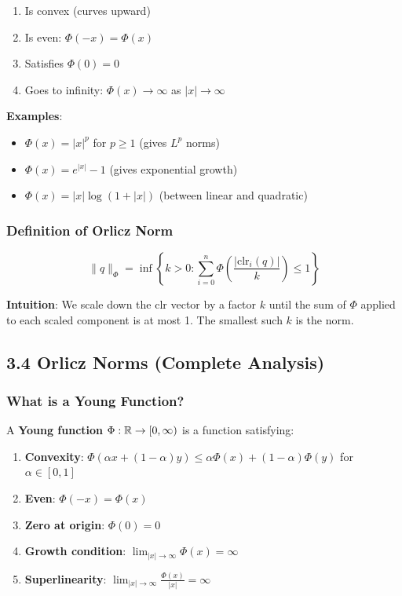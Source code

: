 \documentclass{amsart}
\let\originalmathbb\mathbb
\renewcommand{\mathbb}[1]{%
    \ifstrequal{#1}{1}{\mathbbm{#1}}{\originalmathbb{#1}}%
}
\theoremstyle{plain}
\theoremstyle{definition}
\theoremstyle{remark}
\begin{document}
\begin{enumerate}
	\item Is convex (curves upward)
	\item Is even: $\Phi(-x) = \Phi(x)$
	\item Satisfies $\Phi(0) = 0$
	\item Goes to infinity: $\Phi(x) \to \infty$ as $|x| \to \infty$
\end{enumerate}

\textbf{Examples}:

\begin{itemize}
	\item $\Phi(x) = |x|^p$ for $p \geq 1$ (gives $L^p$ norms)
	\item $\Phi(x) = e^{|x|} - 1$ (gives exponential growth)
	\item $\Phi(x) = |x| \log(1 + |x|)$ (between linear and quadratic)
\end{itemize}

\subsubsection{Definition of Orlicz Norm}
\[
\|q\|_\Phi = \inf \left\{ k > 0 : \sum_{i=0}^n \Phi\left(\frac{|\text{clr}_i(q)|}{k}\right) \leq 1 \right\}
\]

\textbf{Intuition}: We scale down the clr vector by a factor $k$ until the sum of $\Phi$ applied to each scaled component is at most 1. The smallest such $k$ is the norm.

\subsection{3.4 Orlicz Norms (Complete Analysis)}

\subsubsection{What is a Young Function?}

A \textbf{Young function} $\Phi: \mathbb{R} \to [0, \infty)$ is a function satisfying:

\begin{enumerate}
	\item \textbf{Convexity}: $\Phi(\alpha x + (1-\alpha)y) \leq \alpha\Phi(x) + (1-\alpha)\Phi(y)$ for $\alpha \in [0,1]$
	\item \textbf{Even}: $\Phi(-x) = \Phi(x)$
	\item \textbf{Zero at origin}: $\Phi(0) = 0$
	\item \textbf{Growth condition}: $\lim_{|x| \to \infty} \Phi(x) = \infty$
	\item \textbf{Superlinearity}: $\lim_{|x| \to \infty} \frac{\Phi(x)}{|x|} = \infty$
\end{enumerate}
\end{document}
